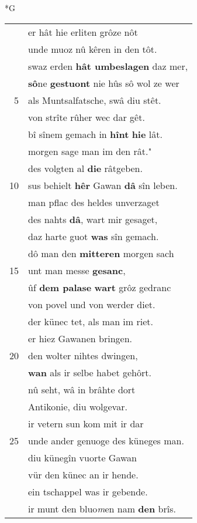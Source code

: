 \documentclass[8pt,a4paper,notitlepage]{article}
\begin{document}
\begin{table}[ht]
\begin{minipage}[t]{0.5\linewidth}
\small
\begin{center}*G
\end{center}
\begin{tabular}{rl}
 & er hât hie erliten grôze nôt\\ 
 & unde muoz nû kêren in den tôt.\\ 
 & swaz erden \textbf{hât umbeslagen} daz mer,\\ 
 & \textbf{sô}ne \textbf{gestuont} nie hûs sô wol ze wer\\ 
5 & als Muntsalfatsche, swâ diu stêt.\\ 
 & von strîte rûher wec dar gêt.\\ 
 & bî sînem gemach in \textbf{hînt} \textbf{hie} lât.\\ 
 & morgen sage man im den rât."\\ 
 & des volgten al \textbf{die} râtgeben.\\ 
10 & sus behielt \textbf{hêr} Gawan \textbf{dâ} sîn leben.\\ 
 & man pflac des heldes unverzaget\\ 
 & des nahts \textbf{dâ}, wart mir gesaget,\\ 
 & daz harte guot \textbf{was} sîn gemach.\\ 
 & dô man den \textbf{mitteren} morgen sach\\ 
15 & unt man messe \textbf{gesanc},\\ 
 & ûf \textbf{dem palase} \textbf{wart} grôz gedranc\\ 
 & von povel und von werder diet.\\ 
 & der künec tet, als man im riet.\\ 
 & er hiez Gawanen bringen.\\ 
20 & den wolter nihtes dwingen,\\ 
 & \textbf{wan} als ir selbe habet gehôrt.\\ 
 & nû seht, wâ in brâhte dort\\ 
 & Antikonie, diu wolgevar.\\ 
 & ir vetern sun kom mit ir dar\\ 
25 & unde ander genuoge des küneges man.\\ 
 & diu künegîn vuorte Gawan\\ 
 & vür den künec an ir hende.\\ 
 & ein tschappel was ir gebende.\\ 
 & ir munt den bluo\textit{m}en nam \textbf{den} brîs.\\ 

\end{tabular}
\end{minipage}
\end{table}
\end{document}
